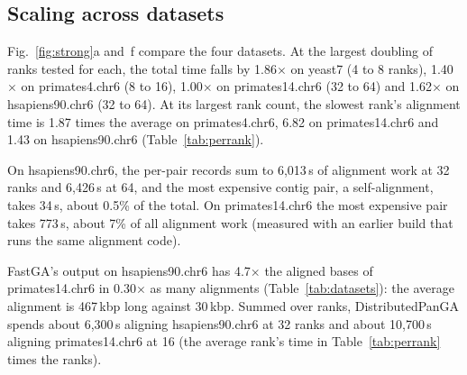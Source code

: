 \subsection{Scaling across datasets}\label{sec:results:scaling}

Fig.~\ref{fig:strong}a and~f compare the four datasets. At the largest
doubling of ranks tested for each, the total time falls by 1.86$\times$ on
yeast7 (4 to 8 ranks), 1.40$\times$ on primates4.chr6 (8 to 16),
1.00$\times$ on primates14.chr6 (32 to 64) and 1.62$\times$ on
hsapiens90.chr6 (32 to 64). At its largest rank count, the slowest rank's
alignment time is 1.87 times the average on primates4.chr6, 6.82 on
primates14.chr6 and 1.43 on hsapiens90.chr6 (Table~\ref{tab:perrank}).

On hsapiens90.chr6, the per-pair records sum to 6,013\,s of alignment work
at 32 ranks and 6,426\,s at 64, and the most expensive contig pair, a
self-alignment, takes 34\,s, about 0.5\% of the total. On primates14.chr6
the most expensive pair takes 773\,s, about 7\% of all alignment work
(measured with an earlier build that runs the same alignment code).

FastGA's output on hsapiens90.chr6 has 4.7$\times$ the aligned bases of
primates14.chr6 in 0.30$\times$ as many alignments
(Table~\ref{tab:datasets}): the average alignment is 467\,kbp long against
30\,kbp. Summed over ranks, DistributedPanGA spends about 6,300\,s aligning
hsapiens90.chr6 at 32 ranks and about 10,700\,s aligning primates14.chr6 at
16 (the average rank's time in Table~\ref{tab:perrank} times the ranks).
